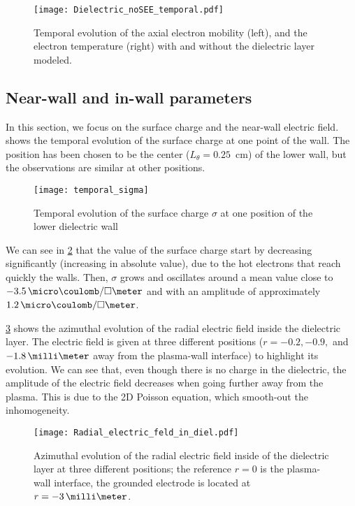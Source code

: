   \begin{figure}[hbt]
    \centering
    \texttt{[image: Dielectric\_noSEE\_temporal.pdf]}
    \caption{Temporal evolution of the axial electron mobility (left), and the electron temperature (right) with and without the dielectric layer modeled.}
    \label{fig-mod_diel_comp}
  \end{figure}

  
  \subsection{Near-wall and in-wall parameters} \label{subsec-nearwall}
    In this section, we focus on the surface charge and the near-wall electric field.
     shows the temporal evolution of the surface charge at one point of the wall.
    The position has been chosen to be the center ($L_{\theta} = 0.25$~cm) of the lower wall, but the observations are similar at other positions.
     
    \begin{figure}[!hbt]
      \centering
      \texttt{[image: temporal\_sigma]}
      \caption{Temporal evolution of the surface charge $\sigma$ at one position of the lower dielectric wall}
      \label{fig-sigma_time}
    \end{figure}

    We can see in \cref{fig-sigma_time} that the value of the surface charge start by decreasing significantly (increasing in absolute value), due to the hot electrons that reach quickly the walls.
    Then, $\sigma$ grows and oscillates around a mean value close to $-3.5 \,\micro\coulomb/\square\meter$ and with an amplitude of approximately $1.2 \,\micro\coulomb/\square\meter$.
    
    \cref{fig-indiel} shows the azimuthal evolution of the radial electric field inside the dielectric layer.
    The electric field is given at three different positions ($r=-0.2, -0.9,$ and $-1.8\,\milli\meter$ away from the plasma-wall interface) to highlight its evolution.
    We can see that, even though there is no charge in the dielectric, the amplitude of the electric field decreases when going further away from the plasma.
    This is due to the \ac{2D} Poisson equation, which smooth-out the inhomogeneity.
     
    \begin{figure}[!hbt]
      \centering
      \texttt{[image: Radial\_electric\_feld\_in\_diel.pdf]}
      \caption{Azimuthal evolution of the radial electric field inside of the dielectric layer at three different positions; the reference $r=0$ is the plasma-wall interface, the grounded electrode is located at $r=-3\,\milli\meter$.}
      \label{fig-indiel}
    \end{figure}

